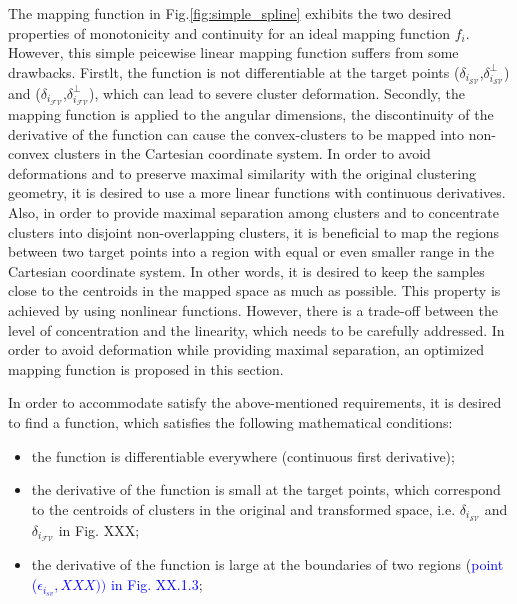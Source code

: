 The mapping function in Fig.\ref{fig:simple_spline} exhibits the two desired properties of monotonicity and continuity for an ideal mapping function $f_i$. However, this simple peicewise linear mapping function suffers from some drawbacks. Firstlt, the function is not differentiable at the target points ($\delta_{i_{{\mathcal{SV}}}}$,$\delta^{\perp}_{i_{{\mathcal{SV}}}}$) and ($\delta_{i_{{\mathcal{FV}}}}$,$\delta^{\perp}_{i_{{\mathcal{FV}}}}$), which can lead to severe cluster deformation. Secondly, the mapping function is applied to the angular dimensions, the discontinuity of the derivative of  %
the function can cause the convex-clusters to be mapped into non-convex clusters in the Cartesian coordinate system. In order to avoid deformations and to preserve maximal similarity with the original clustering geometry, it is desired to use a more linear functions with continuous derivatives. Also, in order to provide maximal separation among clusters and to concentrate clusters into disjoint non-overlapping clusters, it is beneficial to map the regions between two target points into a region with equal or even smaller range in the Cartesian coordinate system. In other words, it is desired to keep the samples close to the centroids in the mapped space as much as possible. This property is achieved by using nonlinear functions. However, there is a trade-off between the level of concentration and the linearity, which needs to be carefully addressed.  In order to avoid deformation while providing maximal separation, an optimized mapping function is proposed in this section.

In order to accommodate satisfy the above-mentioned requirements, it is desired to find a function, which satisfies the following mathematical conditions:

\begin{itemize}
\item the function is differentiable everywhere (continuous first derivative);
\item the derivative of the function is small at the target points, which correspond to the centroids of clusters in the original and transformed space, i.e. $\delta_{i_{{\mathcal{SV}}}}$ and $\delta_{i_{{\mathcal{FV}}}}$ in Fig. XXX;
\item the derivative of the function is large at the boundaries of two regions (\textcolor{blue}{point ($\epsilon_{i_{sv}},XXX))$ in Fig. XX.1.3};
\end{itemize}


